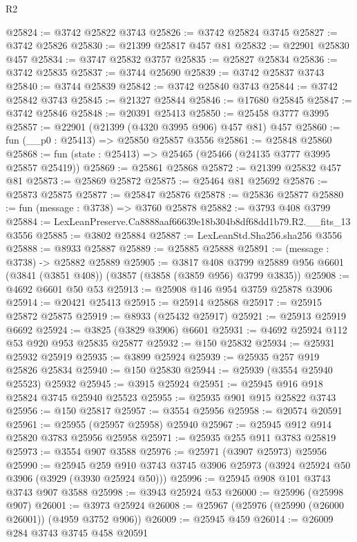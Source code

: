 \begin{lexlean}{R2}
\begin{coremodule}
@25824 := @3742 @25822 @3743
@25826 := @3742 @25824 @3745
@25827 := @3742 @25826
@25830 := @21399 @25817 @457 @81
@25832 := @22901 @25830 @457
@25834 := @3747 @25832 @3757
@25835 := @25827 @25834
@25836 := @3742 @25835
@25837 := @3744 @25690
@25839 := @3742 @25837 @3743
@25840 := @3744 @25839
@25842 := @3742 @25840 @3743
@25844 := @3742 @25842 @3743
@25845 := @21327 @25844
@25846 := @17680 @25845
@25847 := @3742 @25846
@25848 := @20391 @25413
@25850 := @25458 @3777 @3995
@25857 := @22901 (@21399 (@4320 @3995 @906) @457 @81) @457
@25860 := fun (__p0 : @25413) => @25850 @25857 @3556
@25861 := @25848 @25860
@25868 := fun (state : @25413) => @25465 (@25466 (@24135 @3777 @3995 @25857 @25419))
@25869 := @25861 @25868
@25872 := @21399 @25832 @457 @81
@25873 := @25869 @25872
@25875 := @25464 @81 @25692
@25876 := @25873 @25875
@25877 := @25847 @25876
@25878 := @25836 @25877
@25880 := fun (message : @3738) => @3760 @25878
@25882 := @3793 @408 @3799
@25884 := LexLeanPreserve.Ca8888aaf66639e18b304b8df68dd1b79.R2.__fits_13 @3556
@25885 := @3802 @25884
@25887 := LexLeanStd.Sha256.sha256 @3556
@25888 := @8933 @25887
@25889 := @25885 @25888
@25891 := (message : @3738) -> @25882 @25889
@25905 := @3817
    @408
    @3799
    @25889
    @956
    @6601
    (@3841 (@3851 @408))
    (@3857 (@3858 (@3859 @956) @3799 @3835))
@25908 := @4692 @6601 @50 @53
@25913 := @25908 @146 @954 @3759 @25878 @3906
@25914 := @20421 @25413
@25915 := @25914 @25868
@25917 := @25915 @25872 @25875
@25919 := @8933 (@25432 @25917)
@25921 := @25913 @25919 @6692
@25924 := @3825 (@3829 @3906) @6601
@25931 := @4692 @25924 @112 @53 @920 @953 @25835 @25877
@25932 := @150 @25832
@25934 := @25931 @25932 @25919
@25935 := @3899 @25924
@25939 := @25935 @257 @919 @25826 @25834
@25940 := @150 @25830
@25944 := @25939 (@3554 @25940 @25523) @25932
@25945 := @3915 @25924
@25951 := @25945 @916 @918 @25824 @3745 @25940 @25523
@25955 := @25935 @901 @915 @25822 @3743
@25956 := @150 @25817
@25957 := @3554 @25956
@25958 := @20574 @20591
@25961 := @25955 (@25957 @25958) @25940
@25967 := @25945 @912 @914 @25820 @3783 @25956 @25958
@25971 := @25935 @255 @911 @3783 @25819
@25973 := @3554 @907 @3588
@25976 := @25971 (@3907 @25973) @25956
@25990 := @25945
    @259
    @910
    @3743
    @3745
    @3906
    @25973
    (@3924 @25924 @50 @3906 (@3929 (@3930 @25924 @50)))
@25996 := @25945 @908 @101 @3743 @3743 @907 @3588
@25998 := @3943 @25924 @53
@26000 := @25996 (@25998 @907)
@26001 := @3973 @25924
@26008 := @25967 (@25976 (@25990 (@26000 @26001)) (@4959 @3752 @906))
@26009 := @25945 @459
@26014 := @26009 @284 @3743 @3745 @458 @20591

\end{coremodule}
\end{lexlean}
